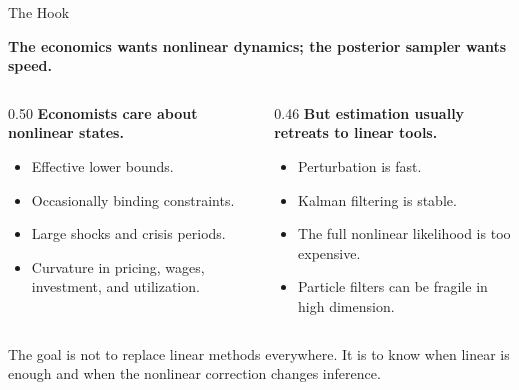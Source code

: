 \documentclass[aspectratio=169,10pt]{beamer}
\newcommand{\claim}[1]{%
  \begin{center}
  \parbox{0.94\linewidth}{\centering\large\bfseries #1}
  \end{center}
}
\begin{document}
\begin{frame}{The Hook}
\claim{The economics wants nonlinear dynamics; the posterior sampler wants speed.}

\vspace{0.5em}
\begin{columns}[T,onlytextwidth]
\begin{column}{0.50\textwidth}
\textbf{Economists care about nonlinear states.}
\begin{itemize}
  \item Effective lower bounds.
  \item Occasionally binding constraints.
  \item Large shocks and crisis periods.
  \item Curvature in pricing, wages, investment, and utilization.
\end{itemize}
\end{column}
\begin{column}{0.46\textwidth}
\textbf{But estimation usually retreats to linear tools.}
\begin{itemize}
  \item Perturbation is fast.
  \item Kalman filtering is stable.
  \item The full nonlinear likelihood is too expensive.
  \item Particle filters can be fragile in high dimension.
\end{itemize}
\end{column}
\end{columns}

\vspace{0.55em}
\begin{center}
\normalsize The goal is not to replace linear methods everywhere. It is to know when linear is enough and when the nonlinear correction changes inference.
\end{center}
\end{frame}
\end{document}
